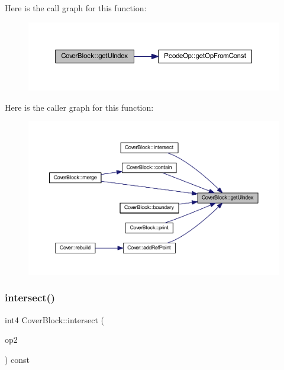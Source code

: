 Here is the call graph for this function\+:
\nopagebreak
\begin{figure}[H]
\begin{center}
\leavevmode
\includegraphics[width=350pt]{class_cover_block_ad0e8085aae35a181fd4c1666f53429ee_cgraph}
\end{center}
\end{figure}
Here is the caller graph for this function\+:
\nopagebreak
\begin{figure}[H]
\begin{center}
\leavevmode
\includegraphics[width=350pt]{class_cover_block_ad0e8085aae35a181fd4c1666f53429ee_icgraph}
\end{center}
\end{figure}
\mbox{\label{class_cover_block_a26da4f088471ccf7e896fa2e7f657444}} 
\subsubsection{\texorpdfstring{intersect()}{intersect()}}
{\footnotesize\ttfamily int4 Cover\+Block\+::intersect (\begin{DoxyParamCaption}\item[{const \mbox{\hyperlink{class_cover_block}{Cover\+Block}} \&}]{op2 }\end{DoxyParamCaption}) const}



